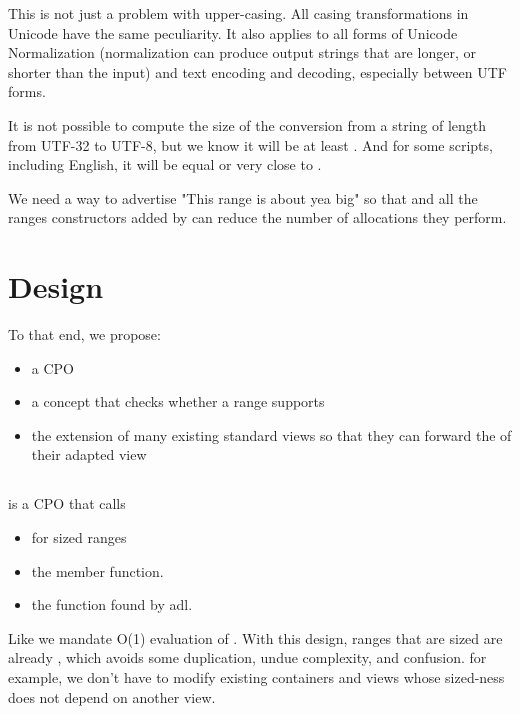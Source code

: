 \documentclass{wg21}
\begin{document}
This is not just a problem with upper-casing. All casing transformations in Unicode have the same peculiarity.
It also applies to all forms of Unicode Normalization (normalization can produce output strings that are longer, or shorter than the input)
and text encoding and decoding, especially between UTF forms.

It is not possible to compute the size of the conversion from a string of length  from UTF-32 to UTF-8, but we know it will be at least .
And for some scripts, including English, it will be equal or very close to .


We need a way to advertise "This range is about yea big" so that  and all the ranges constructors added by 
can reduce the number of allocations they perform.

\section{Design}

To that end, we propose:

\begin{itemize}
\item a  CPO
\item a  concept that checks whether a range supports 
\item the extension of many existing standard views so that they can forward the  of their adapted view
\end{itemize}

\subsection{}

 is a CPO that calls
\begin{itemize}
    \item {} for sized ranges
    \item the  member function.
    \item the  function found by adl.
\end{itemize}

Like  we mandate O(1) evaluation of .
With this design, ranges that are sized are already , which avoids some duplication, undue complexity, and confusion.
for example, we don't have to modify existing containers and views whose sized-ness does not depend on another view.
\end{document}
